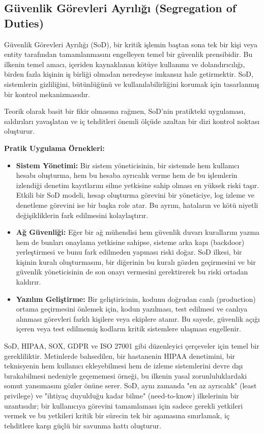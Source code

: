 \subsection{Güvenlik Görevleri Ayrılığı (Segregation of Duties)}

Güvenlik Görevleri Ayrılığı (SoD), bir kritik işlemin baştan sona tek bir kişi veya entity tarafından tamamlanmasını engelleyen temel bir güvenlik prensibidir. Bu ilkenin temel amacı, içeriden kaynaklanan kötüye kullanımı ve dolandırıcılığı, birden fazla kişinin iş birliği olmadan neredeyse imkansız hale getirmektir. SoD, sistemlerin gizliliğini, bütünlüğünü ve kullanılabilirliğini korumak için tasarlanmış bir kontrol mekanizmasıdır.

Teorik olarak basit bir fikir olmasına rağmen, SoD'nin pratikteki uygulaması, saldırıları yavaşlatan ve iç tehditleri önemli ölçüde azaltan bir dizi kontrol noktası oluşturur.

\textbf{Pratik Uygulama Örnekleri:}

\begin{itemize}
    \item \textbf{Sistem Yönetimi:} Bir sistem yöneticisinin, bir sistemde hem kullanıcı hesabı oluşturma, hem bu hesaba ayrıcalık verme hem de bu işlemlerin izlendiği denetim kayıtlarını silme yetkisine sahip olması en yüksek riski taşır. Etkili bir SoD modeli, hesap oluşturma görevini bir yöneticiye, log izleme ve denetleme görevini ise bir başka role atar. Bu ayrım, hataların ve kötü niyetli değişikliklerin fark edilmesini kolaylaştırır.
    \item \textbf{Ağ Güvenliği:} Eğer bir ağ mühendisi hem güvenlik duvarı kurallarını yazma hem de bunları onaylama yetkisine sahipse, sisteme arka kapı (backdoor) yerleştirmesi ve bunu fark edilmeden yapması riski doğar. SoD ilkesi, bir kişinin kuralı oluşturmasını, bir diğerinin bu kuralı gözden geçirmesini ve bir güvenlik yöneticisinin de son onayı vermesini gerektirerek bu riski ortadan kaldırır.
    \item \textbf{Yazılım Geliştirme:} Bir geliştiricinin, kodunu doğrudan canlı (production) ortama geçirmesini önlemek için, kodun yazılması, test edilmesi ve canlıya alınması görevleri farklı kişilere veya ekiplere atanır. Bu sayede, güvenlik açığı içeren veya test edilmemiş kodların kritik sistemlere ulaşması engellenir.
\end{itemize}

SoD, HIPAA, SOX, GDPR ve ISO 27001 gibi düzenleyici çerçeveler için temel bir gerekliliktir. Metinlerde bahsedilen, bir hastanenin HIPAA denetimini, bir teknisyenin hem kullanıcı ekleyebilmesi hem de izleme sistemlerini devre dışı bırakabilmesi nedeniyle geçememesi örneği, bu ilkenin yasal zorunluluklardaki somut yansımasını gözler önüne serer. SoD, aynı zamanda "en az ayrıcalık" (least privilege) ve "ihtiyaç duyulduğu kadar bilme" (need-to-know) ilkelerinin bir uzantısıdır; bir kullanıcıya görevini tamamlaması için sadece gerekli yetkileri vermek ve bu yetkileri kritik bir sürecin tek bir aşamasına sınırlamak, iç tehditlere karşı güçlü bir savunma hattı oluşturur.

